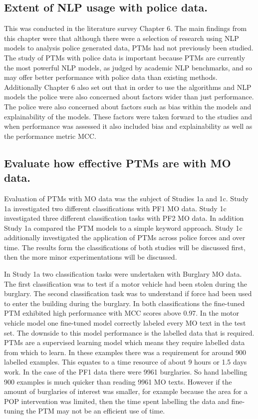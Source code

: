 \subsection{Extent of NLP usage with police data.} This was conducted in the literature survey Chapter 6. The main findings from this chapter were that although there were a selection of research using NLP models to analysis police generated data, PTMs had not previously been studied. The study of PTMs with police data is important because PTMs are currently the most powerful NLP models, as judged by academic NLP benchmarks, and so may offer better performance with police data than existing methods. Additionally Chapter 6 also set out that in order to use the algorithms and NLP models the police were also concerned about factors wider than just performance. The police were also concerned about factors such as bias within the models and explainability of the models. These  factors were taken forward to the studies and when performance was assessed it also included bias and explainability as well as the performance metric MCC.

\subsection{Evaluate how effective PTMs are with MO data.} Evaluation of PTMs with MO data was the subject of Studies 1a and 1c. Study 1a investigated two different classifications with PF1 MO data. Study 1c investigated three different classification tasks with PF2 MO data. In addition Study 1a compared the PTM models to a simple keyword approach. Study 1c additionally investigated the application of PTMs across police forces and over time. The results form the classifications of both studies will be discussed first, then the more minor experimentations will be discussed.

In Study 1a two classification tasks were undertaken with Burglary MO data. The first classification was to test if a motor vehicle had been stolen during the burglary. The second classification task was to understand if force had been used to enter the building during the burglary. In both classifications the fine-tuned PTM exhibited high performance with MCC scores above 0.97. In the motor vehicle model one fine-tuned model correctly labeled every MO text in the test set.  The downside to this model performance is the labelled data that is required. PTMs are a supervised learning model which means they require labelled data from which to learn. In these examples there was a requirement for around 900 labelled examples. This equates to a time resource of about 9 hours or 1.5 days work.  In the case of the PF1 data there were 9961 burglaries. So hand labelling 900 examples is much quicker than reading 9961 MO texts. However if the amount of burglaries of interest was smaller, for example because the area for a POP intervention was limited, then the time spent labelling the data and fine-tuning the PTM may not be an efficient use of time.


